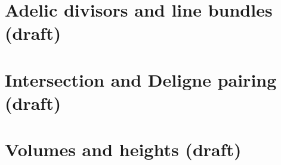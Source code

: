 \documentclass[sectionlevel=book]{noteformyself}
\begin{document}
        \section{Adelic divisors and line bundles (draft)}
        
        \section{Intersection and Deligne pairing (draft)}
        
        \section{Volumes and heights (draft)}
        




    \printbibliography[heading=bibintoc, title={References}] %
\end{document}
